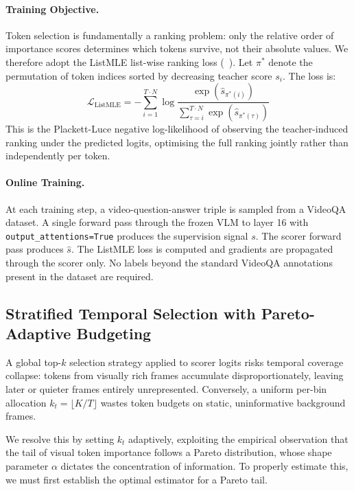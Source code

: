 \documentclass[12pt]{article}
\begin{document}
\paragraph{Training Objective.}
Token selection is fundamentally a ranking problem: only the relative
order of importance scores determines which tokens survive, not their
absolute values. We therefore adopt the ListMLE list-wise ranking
loss (~\cite{10.5555/3020751.3020798}). Let $\pi^*$ denote the permutation of
token indices sorted by decreasing teacher score $s_i$. The loss is:
%
\begin{equation}
    \mathcal{L}_{\text{ListMLE}} =
    -\sum_{i=1}^{T \cdot N}
    \log \frac{
        \exp(\hat{s}_{\pi^*(i)})
    }{
        \displaystyle\sum_{\tau=i}^{T \cdot N}
        \exp(\hat{s}_{\pi^*(\tau)})
    }
\end{equation}
%
This is the Plackett-Luce negative log-likelihood of observing the
teacher-induced ranking under the predicted logits, optimising the
full ranking jointly rather than independently per token.
 
\paragraph{Online Training.}
At each training step, a video-question-answer triple is sampled from a
VideoQA dataset. A single forward pass through the frozen VLM to layer
16 with \texttt{output\_attentions=True} produces the supervision
signal $s$. The scorer forward pass produces $\hat{s}$. The ListMLE
loss is computed and gradients are propagated through the scorer only.
No labels beyond the standard VideoQA annotations present in the
dataset are required.
 
\subsection{Stratified Temporal Selection with Pareto-Adaptive Budgeting}

A global top-$k$ selection strategy applied to scorer logits risks temporal coverage collapse: tokens from visually rich frames accumulate disproportionately, leaving later or quieter frames entirely unrepresented. Conversely, a uniform per-bin allocation $k_t = \lfloor K / T \rfloor$ wastes token budgets on static, uninformative background frames. 

We resolve this by setting $k_t$ adaptively, exploiting the empirical observation that the tail of visual token importance follows a Pareto distribution, whose shape parameter $\alpha$ dictates the concentration of information. To properly estimate this, we must first establish the optimal estimator for a Pareto tail.
\end{document}
